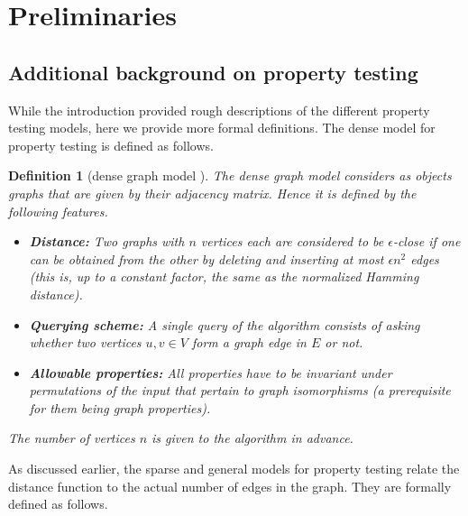 \documentclass[11pt]{article}
\newtheorem{definition}[theorem]{Definition}
\begin{document}
\section{Preliminaries}
\label{sec:prelim}
\subsection{Additional background on property testing}
While the introduction provided rough descriptions of the different property testing models, here we provide more formal definitions. The dense model for property testing is defined as follows.

\begin{definition}[dense graph model \cite{GGR98}]
	The dense graph model considers as objects graphs that are given by their adjacency matrix. Hence it is defined by the following features.
	\begin{itemize}
		\item {\bf Distance:} Two graphs with $n$ vertices each are considered to be {\em $\epsilon$-close} if one can be obtained from the other by deleting and inserting at most $\epsilon n^2$ edges (this is, up to a constant factor, the same as the normalized Hamming distance).
		\item {\bf Querying scheme:} A single query of the algorithm consists of asking whether two vertices $u,v\in V$ form a graph edge in $E$ or not.
		\item {\bf Allowable properties:} All properties have to be invariant under permutations of the input that pertain to graph isomorphisms (a prerequisite for them being graph properties).
	\end{itemize}
	The number of vertices $n$ is given to the algorithm in advance.
\end{definition}






As discussed earlier, the sparse and general models for property testing relate the distance function to the actual number of edges in the graph. They are formally defined as follows.
\end{document}
